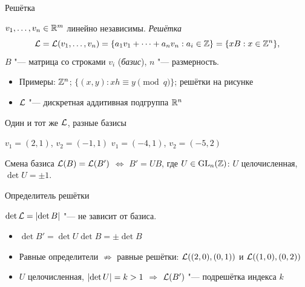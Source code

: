 \documentclass{ca-slides}
\begin{document}
\begin{canvasframe}{Решётка}
  \begin{definition}
    $v_1, \dots, v_n \in \mathbb{R}^m$ линейно независимы. \emph{Решётка}
    \[\mathcal{L} = \mathcal{L}(v_1, \dots, v_n) = \{a_1 v_1 + \cdots + a_n v_n : a_i \in \mathbb{Z}\} = \{xB : x \in \mathbb{Z}^n\},\]
    $B$ "--- матрица со строками $v_i$ (\emph{базис}), $n$ "--- размерность.
  \end{definition}
  \begin{itemize}
    \item Примеры: $\mathbb{Z}^n$; $\{(x, y) : xh \equiv y \pmod q\}$; решётки на рисунке
    \item $\mathcal{L}$ "--- дискретная аддитивная подгруппа $\mathbb{R}^n$
  \end{itemize}
  \penspace[0.15\textheight]
\end{canvasframe}

\begin{canvasframe}{Один и тот же $\mathcal{L}$, разные базисы}
  \centering
  \qquad
  \par\medskip
  $v_1 = (2, 1)$, $v_2 = (-1, 1)$ \hspace{3.5cm} $v_1 = (-4, 1)$, $v_2 = (-5, 2)$
\end{canvasframe}

\begin{theoremframe}{Смена базиса}
  $\mathcal{L}(B) = \mathcal{L}(B')$ $\iff$ $B' = UB$, где $U \in \mathrm{GL}_n(\mathbb{Z})$: $U$ целочисленная,
  $\det U = \pm 1$.
\end{theoremframe}

\begin{canvasframe}{Определитель решётки}
  \begin{definition}
    $\det \mathcal{L} = \lvert\det B\rvert$ "--- не зависит от базиса.
  \end{definition}
  \begin{itemize}
    \item $\det B' = \det U \det B = \pm\det B$
    \item Равные определители $\not\Rightarrow$ равные решётки: $\mathcal{L}((2, 0), (0, 1))$ и
      $\mathcal{L}((1, 0), (0, 2))$
    \item $U$ целочисленная, $\lvert\det U\rvert = k > 1$ $\Rightarrow$ $\mathcal{L}(B')$ "--- подрешётка
      индекса $k$
  \end{itemize}
  \penspace[0.12\textheight]
\end{canvasframe}
\end{document}
